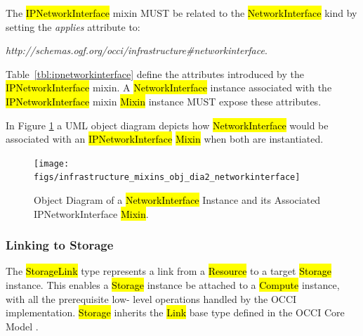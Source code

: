 \documentclass[10pt,a4paper]{article}
\begin{document}
The \hl{IPNetworkInterface} mixin MUST be related to the \hl{NetworkInterface} kind
by setting the \textit{applies} attribute to:

\textit{http://schemas.ogf.org/occi/infrastructure\#networkinterface}.

Table~\ref{tbl:ipnetworkinterface} define the attributes introduced by
the \hl{IPNetworkInterface} mixin.  A \hl{NetworkInterface} instance
associated with the \hl{IPNetworkInterface} mixin \hl{Mixin} instance
MUST expose these attributes.


In Figure \ref{fig:networkinterface_mixin} a UML object diagram
depicts how \hl{NetworkInterface} would be associated with an
\hl{IPNetworkInterface} \hl{Mixin} when both are instantiated.

\begin{figure}[!h]
	\centering
	\texttt{[image: figs/infrastructure\_mixins\_obj\_dia2\_networkinterface]}
	\caption{Object Diagram of a \hl{NetworkInterface} Instance and its Associated
	IPNetworkInterface \hl{Mixin}.}
	\label{fig:networkinterface_mixin}
\end{figure}

\subsubsection{Linking to Storage}
The \hl{StorageLink} type represents a link from a \hl{Resource} to a
target \hl{Storage} instance. This enables a \hl{Storage} instance be
attached to a \hl{Compute} instance, with all the prerequisite low-
level operations handled by the OCCI implementation. \hl{Storage}
inherits the \hl{Link} base type defined in the OCCI Core Model
\cite{occi:core}.
\end{document}
